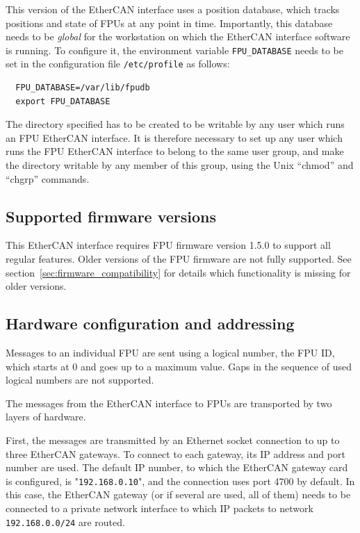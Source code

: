 \documentclass[11pt,a4paper]{report}
\begin{document}
This version of the EtherCAN interface uses a position database, which tracks
positions and state of FPUs at any point in time. Importantly, this
database needs to be \emph{global} for the workstation on which the
EtherCAN interface software is running. To configure it, the environment variable
\texttt{FPU\_DATABASE} needs to be set in the configuration file
\texttt{/etc/profile} as follows:

%
\begin{verbatim}
  FPU_DATABASE=/var/lib/fpudb
  export FPU_DATABASE
\end{verbatim}

The directory specified has to be created to be writable by any user
which runs an FPU EtherCAN interface. It is therefore necessary to set up any user
which runs the FPU EtherCAN interface to belong to the same user group, and make
the directory writable by any member of this group, using the Unix
``chmod'' and ``chgrp'' commands.

\subsection{Supported firmware versions}
This EtherCAN interface requires FPU firmware version 1.5.0 to support all regular
features. Older versions of the FPU firmware are not fully supported.
See section~\ref{sec:firmware_compatibility} for details which
functionality is missing for older versions.

\subsection{Hardware configuration and addressing}
Messages to an individual FPU are sent using a logical number, the FPU
ID, which starts at 0 and goes up to a maximum value. Gaps in the
sequence of used logical numbers are not supported.

The messages from the EtherCAN interface to FPUs are transported by two layers of
hardware.

   First, the
messages are transmitted by an Ethernet socket connection to up to
three EtherCAN gateways. To connect to each gateway, its IP address
and port number are used. The default IP number, to which the EtherCAN
gateway card is configured, is "\texttt{192.168.0.10}", and the
connection uses port 4700 by default. In this case, the EtherCAN
gateway (or if several are used, all of them) needs to be connected to
a private network interface to which IP packets to network
\texttt{192.168.0.0/24} are routed.
\end{document}
